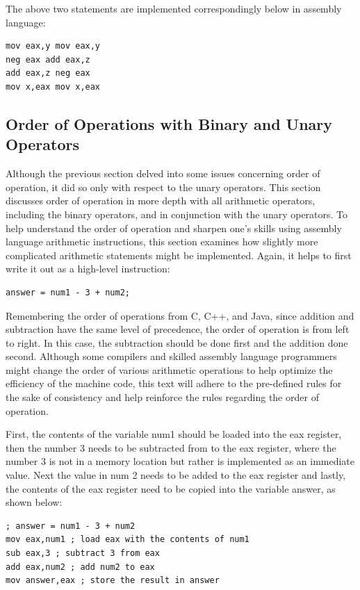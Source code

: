 \documentclass[10pt]{book}
\begin{document}
The above two statements are implemented correspondingly below in assembly language:

\begin{verbatim}
mov eax,y mov eax,y
neg eax add eax,z
add eax,z neg eax
mov x,eax mov x,eax
\end{verbatim}

\subsection{Order of Operations with Binary and Unary Operators}
Although the previous section delved into some issues concerning order of operation, it did so only with respect to the unary operators. This section discusses order of operation in more depth with all arithmetic operators, including the binary operators, and in conjunction with the unary operators. To help understand the order of operation and sharpen one's skills using assembly language arithmetic instructions, this section examines how slightly more complicated arithmetic statements might be implemented. Again, it helps to first write it out as a high-level instruction:

\begin{verbatim}
answer = num1 - 3 + num2;
\end{verbatim}

Remembering the order of operations from C, C++, and Java, since addition and subtraction have the same level of precedence, the order of operation is from left to right. In this case, the subtraction should be done first and the addition done second. Although some compilers and skilled assembly language programmers might change the order of various arithmetic operations to help optimize the efficiency of the machine code, this text will adhere to the pre-defined rules for the sake of consistency and help reinforce the rules regarding the order of operation.

First, the contents of the variable num1 should be loaded into the eax register, then the number 3 needs to be subtracted from to the eax register, where the number 3 is not in a memory location but rather is implemented as an immediate\\
value. Next the value in num 2 needs to be added to the eax register and lastly, the contents of the eax register need to be copied into the variable answer, as shown below:

\begin{verbatim}
; answer = num1 - 3 + num2
mov eax,num1 ; load eax with the contents of num1
sub eax,3 ; subtract 3 from eax
add eax,num2 ; add num2 to eax
mov answer,eax ; store the result in answer
\end{verbatim}
\end{document}
